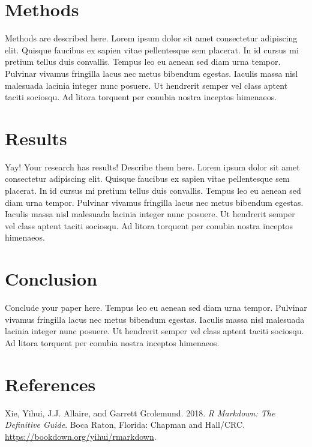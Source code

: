 \documentclass[
  11pt,
  a4paperpaper,
]{article}
\newlength{\cslhangindent}
\newenvironment{CSLReferences}[2] %
 {\begin{list}{}{%
  \setlength{\itemindent}{0pt}
  \setlength{\leftmargin}{0pt}
  \setlength{\parsep}{0pt}
  \ifodd #1
   \setlength{\leftmargin}{\cslhangindent}
   \setlength{\itemindent}{-1\cslhangindent}
  \fi
  \setlength{\itemsep}{#2\baselineskip}}}
 {\end{list}}
\begin{document}
\section*{Methods}

Methods are described here. Lorem ipsum dolor sit amet consectetur
adipiscing elit. Quisque faucibus ex sapien vitae pellentesque sem
placerat. In id cursus mi pretium tellus duis convallis. Tempus leo eu
aenean sed diam urna tempor. Pulvinar vivamus fringilla lacus nec metus
bibendum egestas. Iaculis massa nisl malesuada lacinia integer nunc
posuere. Ut hendrerit semper vel class aptent taciti sociosqu. Ad litora
torquent per conubia nostra inceptos himenaeos.

\section*{Results}

Yay! Your research has results! Describe them here. Lorem ipsum dolor
sit amet consectetur adipiscing elit. Quisque faucibus ex sapien vitae
pellentesque sem placerat. In id cursus mi pretium tellus duis
convallis. Tempus leo eu aenean sed diam urna tempor. Pulvinar vivamus
fringilla lacus nec metus bibendum egestas. Iaculis massa nisl malesuada
lacinia integer nunc posuere. Ut hendrerit semper vel class aptent
taciti sociosqu. Ad litora torquent per conubia nostra inceptos
himenaeos.

\section*{Conclusion}

Conclude your paper here. Tempus leo eu aenean sed diam urna tempor.
Pulvinar vivamus fringilla lacus nec metus bibendum egestas. Iaculis
massa nisl malesuada lacinia integer nunc posuere. Ut hendrerit semper
vel class aptent taciti sociosqu. Ad litora torquent per conubia nostra
inceptos himenaeos.

\newpage

\section*{References}

\label{refs}
\begin{CSLReferences}{1}{0}
Xie, Yihui, J.J. Allaire, and Garrett Grolemund. 2018. \emph{R Markdown:
The Definitive Guide}. Boca Raton, Florida: Chapman and Hall/CRC.
\url{https://bookdown.org/yihui/rmarkdown}.

\end{CSLReferences}
\end{document}
